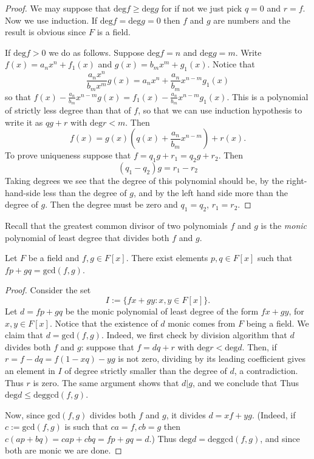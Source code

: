 \begin{proof}
We may suppose that $\text{deg}f \geq
\text{deg}g$ for if not we just pick
$q=0$ and $r=f$. Now we use induction.
If $\text{deg}f=\text{deg}g=0$ then $f$ and
$g$ are numbers and the result is
obvious since $F$ is a field.

If $\text{deg}f>0$ we do as follows. Suppose
$\text{deg}f=n$ and
$\text{deg}g=m$. Write $f(x)=a_nx^n+f_1(x)$
and $g(x)=b_mx^m+g_1(x)$. Notice
that
$$
\frac{a_nx^n}{b_mx^m}g(x)=a_nx^n+\frac{a_n}
{b_m}x^{n-m}g_1(x)
$$
so that
$f(x)-\frac{a_n}{b_m}x^{n-m}g(x)=f_1(x)-
\frac{a_n}{b_m}x^{n-m}g_1(x)$.
This is a polynomial of strictly less degree
than that of $f$, so that we can
use induction hypothesis to write it as
$qg+r$ with $\text{deg}r<m$. Then
$$
f(x)=g(x)\left(q(x)+\frac{a_n}{b_m}x^{n-m}
\right)+r(x).
$$
To prove uniqueness suppose that
$f=q_1g+r_1=q_2g+r_2$.
Then
$$
(q_1-q_2)g=r_1-r_2
$$
Taking degrees we see that the degree of this
polynomial should be,
by the right-hand-side less than the degree
of $g$,
and by the left hand side more than the
degree of $g$.
Then the degree must be zero and $q_1=q_2$,
$r_1=r_2$.
\end{proof}

Recall that the greatest common divisor of
two polynomials $f$ and $g$
is the {\it monic}
polynomial of least degree that divides both
$f$ and $g$.

\begin{theorem}
\label{theorem-bache-bezou-%
polyn-over-fiel}
\begin{reference}
\cite[Theorem 1.53]{MMST}
\end{reference}
Let $F$ be a field and $f,g\in F[x]$.
There exist elements  $p,q \in F[x]$ such
that $fp+gq=\text{gcd}(f,g)$.
\end{theorem}

\begin{proof}
Consider the set
$$
I:=\{fx+gy:x,y \in F[x]\}.
$$
Let $d=fp+gq$ be the monic polynomial of
least degree
of the form $fx+gy$, for $x,y \in F[x]$.
Notice that the existence of $d$ monic comes
from $F$ being a field.
We claim that $d=\text{gcd}(f,g)$.
Indeed, we first check by division algorithm
that $d$ divides both $f$ and $g$:
suppose that $f=dq+r$ with
$\text{deg}r<\text{deg}d$.
Then, if $r=f-dq=f(1-xq)-yg$ is not zero,
dividing by its leading coefficient gives an
element in $I$
of degree strictly smaller than the degree of
$d$, a contradiction.
Thus $r$ is zero. The same argument shows
that $d|g$, and we conclude that
Thus $\text{deg}d \leq
\text{deg}\text{gcd}(f,g)$.

Now, since
$\text{gcd}(f,g)$ divides both $f$ and $g$,
it divides $d=xf+yg$. (Indeed, if
$c:=\text{gcd}(f,g)$ is such that $ca=f,cb=g$
then $c(ap+bq)=cap+cbq=fp+gq=d$.)
Thus $\text{deg}d=\text{deg}\text{gcd}(f,g)$,
and since both are monic we are
done.
\end{proof}

